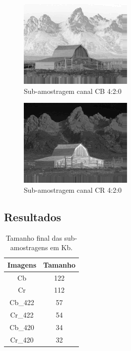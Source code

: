 \documentclass[a4paper, 12pt]{article}
\begin{document}
        \vspace{1cm}

        \begin{multicols}{2}
            \begin{figure}[H]
                \centering
                \includegraphics[scale=1]{resources/Sampling/CB_420.png}
                \caption{\label{fig:my_label} Sub-amostragem canal CB 4:2:0}
            \end{figure}
            \begin{figure}[H]
                \centering
                \includegraphics[scale=1]{resources/Sampling/CR_420.png}
                \caption{\label{fig:my_label} Sub-amostragem canal CR 4:2:0}
            \end{figure}
        \end{multicols}
        
    \subsection{Resultados}
        \begin{table}[H]
            \centering
            \addtolength\tabcolsep{20pt}
            \begin{tabular}{||c | c ||} 
                \hline
                Imagens & Tamanho \\
                \hline\hline
                Cb      & 122 \\
                Cr      & 112 \\
                Cb\_422 & 57  \\
                Cr\_422 & 54  \\
                Cb\_420 & 34  \\
                Cr\_420 & 32  \\ 
                \hline
            \end{tabular}
            \caption{\label{demo-table} Tamanho final das sub-amostragens em Kb.}
        \end{table}
        
\end{document}
